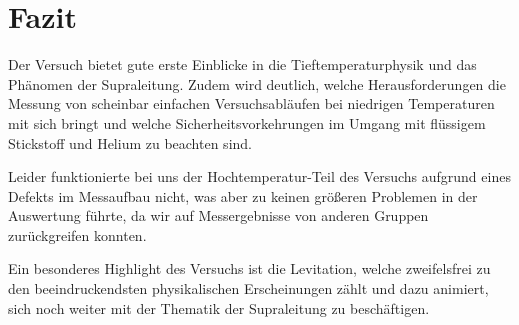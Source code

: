 \chapter{Fazit}
Der Versuch bietet gute erste Einblicke in die Tieftemperaturphysik und das Phänomen der Supraleitung. Zudem wird deutlich, welche Herausforderungen die Messung von scheinbar einfachen Versuchsabläufen bei niedrigen Temperaturen mit sich bringt und welche Sicherheitsvorkehrungen im Umgang mit flüssigem Stickstoff und Helium zu beachten sind.

Leider funktionierte bei uns der Hochtemperatur-Teil des Versuchs aufgrund eines Defekts im Messaufbau nicht, was aber zu keinen größeren Problemen in der Auswertung führte, da wir auf Messergebnisse von anderen Gruppen zurückgreifen konnten.

Ein besonderes Highlight des Versuchs ist die Levitation, welche zweifelsfrei zu den beeindruckendsten physikalischen Erscheinungen zählt und dazu animiert, sich noch weiter mit der Thematik der Supraleitung zu beschäftigen.
